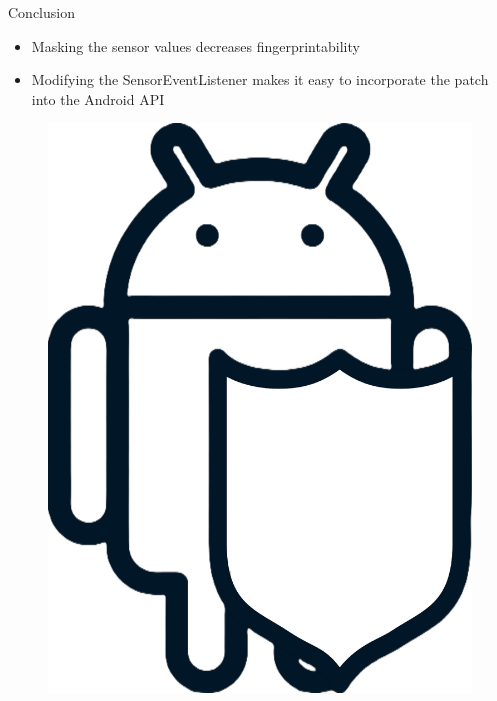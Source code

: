 \documentclass[aspectratio=169]{beamer}
[aspectratio=169] %
\begin{document}
\begin{frame}{Conclusion}
  \begin{minipage}{0.49\textwidth} 
    \begin{itemize}
      \item Masking the sensor values decreases fingerprintability
      \item Modifying the SensorEventListener makes it easy to incorporate the patch into the Android API
    \end{itemize}
  \end{minipage}
  \hfill
  \begin{minipage}{0.49\textwidth} 
    \begin{figure}
      \centering
      \includegraphics[height=0.5\textheight]{figures/androguard.png}
    \end{figure}
  \end{minipage}
\end{frame}


\end{document}
